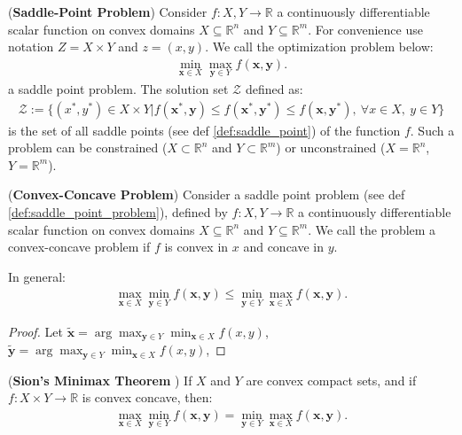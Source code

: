 \begin{definition}
    \label{def:saddle_point_problem}
    (\textbf{Saddle-Point Problem}) Consider $f:X,Y \rightarrow \mathbb{R}$ a continuously differentiable scalar function on  convex domains $X \subseteq \mathbb{R}^n$ and $Y \subseteq \mathbb{R}^m$. For convenience use notation $Z = X\times Y$ and $z=(x,y)$. We call the optimization problem below:
    \begin{align*}
        \min_{\bm{x} \in X} \max_{\bm{y} \in Y} f(\bm{x},\bm{y}).
    \end{align*}
    a saddle point problem. The solution set $\mathcal{Z}$ defined as:
    \begin{align*}
        \mathcal{Z} := \Big\lbrace (x^*,y^*) \in X \times Y  
        \Big |  f(\bm{x}^*,\bm{y}) \leq f(\bm{x}^*,\bm{y}^*) \leq f(\bm{x},\bm{y}^*), ~ \forall x \in X, ~y \in Y
        \Big\rbrace
    \end{align*}
    is the set of all saddle points (see def \ref{def:saddle_point}) of the function $f$. Such a problem can be constrained ($X \subset \mathbb{R}^n$ and $Y \subset \mathbb{R}^m$) or unconstrained  ($X = \mathbb{R}^n$, $Y = \mathbb{R}^m$).
\end{definition}


\begin{definition}
    (\textbf{Convex-Concave Problem}) Consider a saddle point problem (see def \ref{def:saddle_point_problem}), defined by $f:X,Y \rightarrow \mathbb{R}$ a continuously differentiable scalar function on convex domains $X \subseteq \mathbb{R}^n$ and $Y \subseteq \mathbb{R}^m$. We call the problem a convex-concave problem if $f$ is convex in $x$ and concave in $y$.
\end{definition}

\begin{proposition}
    In general:
    \begin{align*}
        \max_{\bm{x} \in X} \min_{\bm{y} \in Y} f(\bm{x},\bm{y}) \leq \min_{\bm{y} \in Y} \max_{\bm{x} \in X} f(\bm{x},\bm{y}).
    \end{align*}
\end{proposition}
\begin{proof}
    Let $\tilde{\bm{x}} = \arg \max_{\bm{y} \in Y} \min_{\bm{x} \in X} f(x,y)$, $\tilde{\bm{y}} = \arg \max_{\bm{y} \in Y} \min_{\bm{x} \in X} f(x,y)$,
\end{proof}

\begin{theorem}
    (\textbf{Sion's Minimax Theorem} \cite{sion_general_1958}) If $X$ and $Y$ are convex compact sets, and if $f:X \times Y \rightarrow \mathbb{R}$ is convex concave, then: 
    \begin{align*}
        \max_{\bm{x} \in X} \min_{\bm{y} \in Y} f(\bm{x},\bm{y}) = \min_{\bm{y} \in Y} \max_{\bm{x} \in X} f(\bm{x},\bm{y}).
    \end{align*}
\end{theorem}


